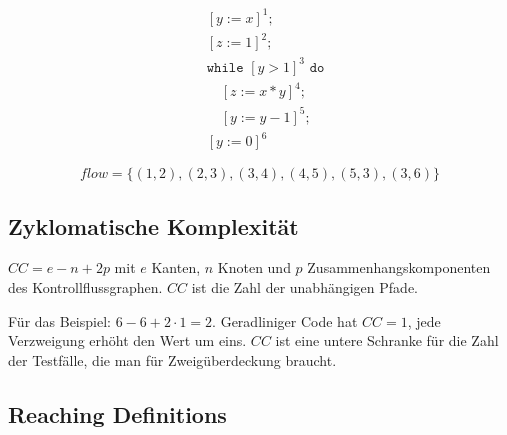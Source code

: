\documentclass[12pt, a4paper]{article}
\begin{document}
\begin{minipage}{0.42\textwidth}
\[
\begin{aligned}
&[y := x]^1;\\
&[z := 1]^2;\\
&\texttt{while } [y > 1]^3 \texttt{ do}\\
&\quad [z := x * y]^4;\\
&\quad [y := y - 1]^5;\\
&[y := 0]^6
\end{aligned}
\]
\end{minipage}
\hfill
\begin{minipage}{0.52\textwidth}
\end{minipage}

\[
flow = \{(1,2), (2,3), (3,4), (4,5), (5,3), (3,6)\}
\]

\subsection{Zyklomatische Komplexität}

\begin{definitionbox}
$CC = e - n + 2p$ mit $e$ Kanten, $n$ Knoten und $p$ Zusammenhangskomponenten des
Kontrollflussgraphen. $CC$ ist die Zahl der unabhängigen Pfade.
\end{definitionbox}

Für das Beispiel: $6 - 6 + 2 \cdot 1 = 2$. Geradliniger Code hat $CC = 1$, jede
Verzweigung erhöht den Wert um eins. $CC$ ist eine untere Schranke für die Zahl der
Testfälle, die man für Zweigüberdeckung braucht.

\subsection{Reaching Definitions}
\end{document}
